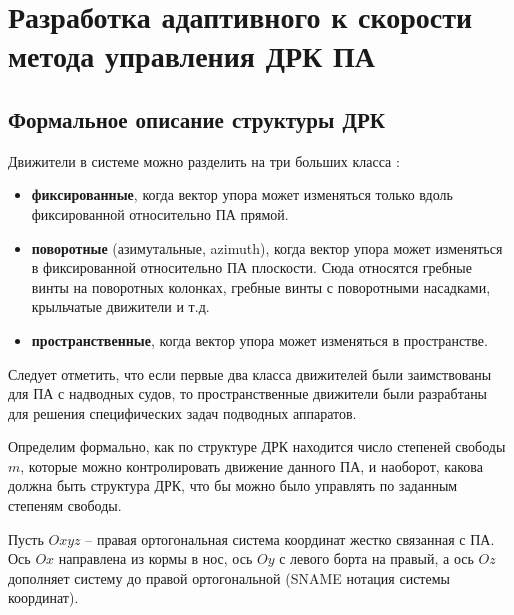 \chapter{Разработка адаптивного к скорости метода управления ДРК ПА}\label{ch:Allocation}

\section{Формальное описание структуры ДРК}\label{sec:Allocation/System}
Движители в системе можно разделить на три больших класса \cite{армишев86}:
\begin{itemize}
    \item \textbf{фиксированные}, когда вектор упора может изменяться только вдоль фиксированной относительно ПА прямой.
    \item \textbf{поворотные} (азимутальные, azimuth), когда вектор упора может изменяться в фиксированной относительно ПА плоскости.
    Сюда относятся гребные винты на поворотных колонках, гребные винты с поворотными насадками, крыльчатые движители и т.д.
    \item \textbf{пространственные}, когда вектор упора может изменяться в пространстве.
\end{itemize}
Следует отметить, что если первые два класса движителей были заимствованы для ПА с надводных судов, то пространственные движители были разрабтаны для решения специфических задач подводных аппаратов.

Определим формально, как по структуре ДРК находится число степеней свободы $m$, которые можно контролировать движение данного ПА, и наоборот, какова должна быть структура ДРК, что бы можно было управлять по заданным степеням свободы.

Пусть $Oxyz$ -- правая ортогональная система координат жестко связанная с ПА. Ось $Ox$ направлена из кормы в нос, ось $Oy$ с левого борта на правый, а ось $Oz$ дополняет систему до правой ортогональной (SNAME нотация системы координат).

